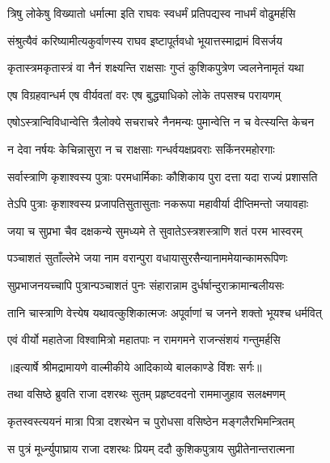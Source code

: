 \twolineshloka
{त्रिषु लोकेषु विख्यातो धर्मात्मा इति राघवः}
{स्वधर्मं प्रतिपद्यस्व नाधर्मं वोढुमर्हसि} %

\twolineshloka
{संश्रुत्यैवं करिष्यामीत्यकुर्वाणस्य राघव}
{इष्टापूर्तवधो भूयात्तस्माद्रामं विसर्जय} %

\twolineshloka
{कृतास्त्रमकृतास्त्रं वा नैनं शक्ष्यन्ति राक्षसाः}
{गुप्तं कुशिकपुत्रेण ज्वलनेनामृतं यथा} %

\twolineshloka
{एष विग्रहवान्धर्म एष वीर्यवतां वरः}
{एष बुद्ध्याधिको लोके तपसश्च परायणम्} %

\twolineshloka
{एषोऽस्त्रान्विविधान्वेत्ति त्रैलोक्ये सचराचरे}
{नैनमन्यः पुमान्वेत्ति न च वेत्स्यन्ति केचन} %

\twolineshloka
{न देवा नर्षयः केचिन्नासुरा न च राक्षसाः}
{गन्धर्वयक्षप्रवराः सकिंनरमहोरगाः} %

\twolineshloka
{सर्वास्त्राणि कृशाश्वस्य पुत्राः परमधार्मिकाः}
{कौशिकाय पुरा दत्ता यदा राज्यं प्रशासति} %

\twolineshloka
{तेऽपि पुत्राः कृशाश्वस्य प्रजापतिसुतासुताः}
{नकरूपा महावीर्या दीप्तिमन्तो जयावहाः} %

\twolineshloka
{जया च सुप्रभा चैव दक्षकन्ये सुमध्यमे}
{ते सुवातेऽस्त्रशस्त्राणि शतं परम भास्वरम्} %

\twolineshloka
{पञ्चाशतं सुताँल्लेभे जया नाम वरान्पुरा}
{वधायासुरसैन्यानाममेयान्कामरूपिणः} %

\twolineshloka
{सुप्रभाजनयच्चापि पुत्रान्पञ्चाशतं पुनः}
{संहारान्नाम दुर्धर्षान्दुराक्रामान्बलीयसः} %

\twolineshloka
{तानि चास्त्राणि वेत्त्येष यथावत्कुशिकात्मजः}
{अपूर्वाणां च जनने शक्तो भूयश्च धर्मवित्} %

\twolineshloka
{एवं वीर्यो महातेजा विश्वामित्रो महातपाः}
{न रामगमने राजन्संशयं गन्तुमर्हसि} %


{॥इत्यार्षे श्रीमद्रामायणे वाल्मीकीये आदिकाव्ये बालकाण्डे विंशः सर्गः॥}


\twolineshloka
{तथा वसिष्ठे ब्रुवति राजा दशरथः सुतम्}
{प्रहृष्टवदनो राममाजुहाव सलक्ष्मणम्} %

\twolineshloka
{कृतस्वस्त्ययनं मात्रा पित्रा दशरथेन च}
{पुरोधसा वसिष्ठेन मङ्गलैरभिमन्त्रितम्} %

\twolineshloka
{स पुत्रं मूर्ध्न्युपाघ्राय राजा दशरथः प्रियम्}
{ददौ कुशिकपुत्राय सुप्रीतेनान्तरात्मना} %

